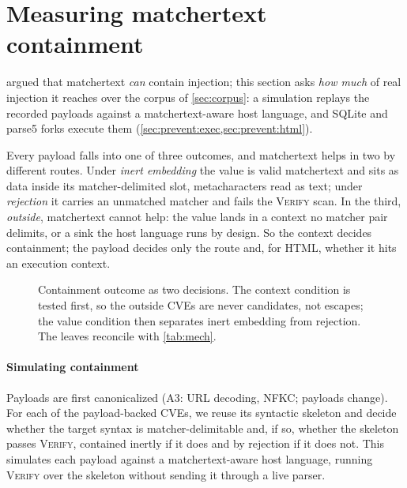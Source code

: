 \section{Measuring matchertext containment}
\label{sec:prevent}

 argued that matchertext \emph{can} contain injection; this
section asks \emph{how much} of real injection it reaches over the corpus of
\cref{sec:corpus}: a simulation replays the recorded payloads against a
matchertext-aware host language, and SQLite and parse5 forks execute them
(\cref{sec:prevent:exec,sec:prevent:html}).

Every payload falls into one of three outcomes, and matchertext helps in two by
different routes. Under \emph{inert embedding} the value is valid matchertext and
sits as data inside its matcher-delimited slot, metacharacters read as text; under
\emph{rejection} it carries an unmatched matcher and fails the \textsc{Verify}
scan. In the third, \emph{outside},
matchertext cannot help: the value lands in a context no matcher pair delimits, or
a sink the host language runs by design. So the context decides
containment; the payload decides only the route and, for HTML, whether it hits an
execution context.

\begin{figure}[t]
\footnotesize

\caption{Containment outcome as two decisions. The context condition is tested
first, so the \dataOutsideCVEs outside CVEs are never candidates, not escapes; the value
condition then separates inert embedding from rejection. The leaves reconcile
with \cref{tab:mech}.}
\label{fig:prevent:tree}
\end{figure}

\paragraph{Simulating containment}
Payloads are first canonicalized (A3: URL decoding, NFKC; \dataCanonChanged payloads change).
For each of the \dataPayloadBackedCVEs payload-backed CVEs, we reuse its syntactic
skeleton and decide whether the target syntax is matcher-delimitable and, if so,
whether the skeleton passes \textsc{Verify}, contained inertly if it does and by
rejection if it does not. This simulates each payload against a matchertext-aware
host language, running \textsc{Verify} over the skeleton without sending it through
a live parser.

\begin{table}[t]
\centering
\caption{Containment outcome by syntax over all \dataPayloadBackedCVEs
payload-backed CVEs. Delimitable contexts (upper block) are contained by inert
embedding or rejection;  counts CVEs failing an assumption of
\cref{sec:threat}.}
\label{tab:mech}
\small

\end{table}


